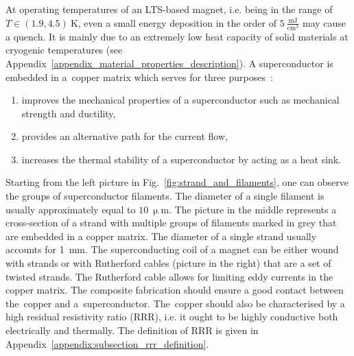 At operating temperatures of an LTS-based magnet, i.e. being in the range of $T \in (1.9, 4.5)~\text{K}$, even a small energy deposition in the order of $5~\frac{\text{mJ}}{\text{cm}^3}$ may cause a quench. It is mainly due to an extremely low heat capacity of solid materials at cryogenic temperatures (see Appendix~\ref{appendix_material_properties_description}). A superconductor is embedded in a~copper matrix which serves for three purposes~\cite[p.~31-33]{superconducting_accelerator_magnets}:

\begin{enumerate}
    \item improves the mechanical properties of a superconductor such as mechanical strength and ductility,
    \item provides an alternative path for the current flow,
    \item increases the thermal stability of a superconductor by acting as a heat sink. 
\end{enumerate}

Starting from the left picture in Fig.~\ref{fig:strand_and_filaments}, one can observe the groups of superconductor filaments. The diameter of a single filament is usually approximately equal to $10~\upmu$m. The picture in the middle represents a cross-section of a strand with multiple groups of filaments marked in grey that are embedded in a copper matrix. The diameter of a single strand usually accounts for 1~mm. The superconducting coil of a magnet can be either wound with strands or with Rutherford cables (picture in the right) that are a set of twisted strands. The Rutherford cable allows for limiting eddy currents in the copper matrix. The composite fabrication should ensure a good contact between the~copper and a~superconductor. The~copper should also be characterised by a high residual resistivity ratio (RRR), i.e. it ought to be highly conductive both electrically and thermally. The definition of RRR is given in Appendix~\ref{appendix:subsection_rrr_definition}.~\cite[p.~31-33]{superconducting_accelerator_magnets}

